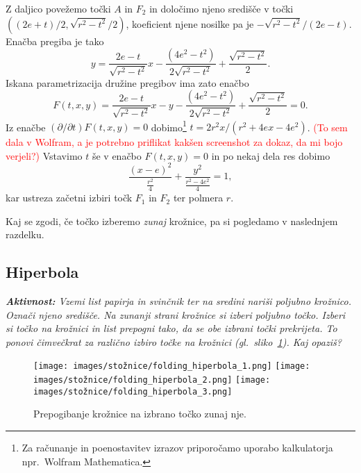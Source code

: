 Z daljico povežemo točki $A$ in $F_2$ in določimo njeno središče v točki $((2e+t)/2, \sqrt{r^2-t^2}/2)$, koeficient njene nosilke pa je $ - \sqrt{r^2-t^2}/(2e-t)$. Enačba pregiba je tako
\begin{equation*}
    \label{eq:tangenta_elipsa}
    y = \frac{2e-t}{\sqrt{r^2-t^2}} x - \frac{(4e^2-t^2)}{2\sqrt{r^2-t^2}} + \frac{\sqrt{r^2-t^2}}{2}.
\end{equation*}
Iskana parametrizacija družine pregibov ima zato enačbo
\begin{equation}
    \label{eq:param_elipsa}
    F(t,x,y) = \frac{2e-t}{\sqrt{r^2-t^2}} x - y - \frac{(4e^2-t^2)}{2\sqrt{r^2-t^2}} + \frac{\sqrt{r^2-t^2}}{2} = 0.
\end{equation}
Iz enačbe $(\partial / \partial t) F(t, x, y) = 0$ dobimo\footnote{Za računanje in poenostavitev izrazov priporočamo uporabo kalkulatorja npr.\ Wolfram Mathematica.} $t = 2r^2x/(r^2+4ex-4e^2)$. \textcolor{red}{(To sem dala v Wolfram, a je potrebno priflikat kakšen screenshot za dokaz, da mi bojo verjeli?)} Vstavimo $t$ še v enačbo $F(t,x,y)=0$ in po nekaj dela res dobimo
\begin{equation*}
    \frac{(x-e)^2}{\frac{r^2}{4}} + \frac{y^2}{\frac{r^2-4e^2}{4}} = 1,
\end{equation*}
kar ustreza začetni izbiri točk $F_1$ in $F_2$ ter polmera $r$.

Kaj se zgodi, če točko izberemo \emph{zunaj} krožnice, pa si pogledamo v naslednjem razdelku.

\subsection{Hiperbola}

\textit{\textbf{Aktivnost:} Vzemi list papirja in svinčnik ter na sredini nariši poljubno krožnico. Označi njeno središče. Na zunanji strani krožnice si izberi poljubno točko. Izberi si točko na krožnici in list prepogni tako, da se obe izbrani točki prekrijeta. To ponovi čimvečkrat za različno izbiro točke na krožnici (gl.\ sliko~\ref{fig:koraki_hiperbola}). Kaj opaziš?}

\begin{figure}[h]
    \centering
    \texttt{[image: images/stožnice/folding\_hiperbola\_1.png]}
    \texttt{[image: images/stožnice/folding\_hiperbola\_2.png]}
    \texttt{[image: images/stožnice/folding\_hiperbola\_3.png]}
    \caption[Prepogibanje hiperbole]{Prepogibanje krožnice na izbrano točko zunaj nje.}
    \label{fig:koraki_hiperbola}
\end{figure}

